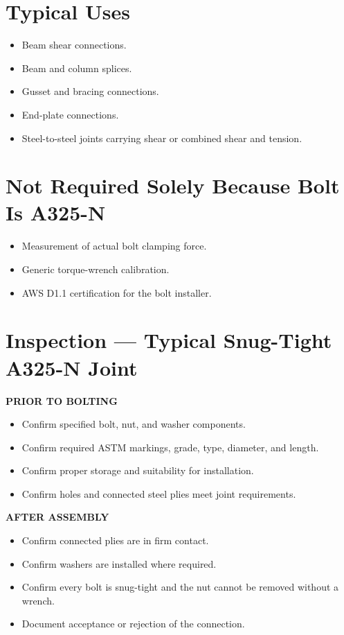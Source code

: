 \documentclass[10pt]{article}
\newcommand{\tightitem}[1]{\item #1}
\begin{document}
\vspace{2pt}
\noindent
\begin{minipage}[t]{0.48\textwidth}
\vspace{0pt}
\section{Typical Uses}

\footnotesize
\begin{itemize}
  \tightitem{Beam shear connections.}
  \tightitem{Beam and column splices.}
  \tightitem{Gusset and bracing connections.}
  \tightitem{End-plate connections.}
  \tightitem{Steel-to-steel joints carrying shear or combined shear and tension.}
\end{itemize}

\setcounter{section}{4}
\section{Not Required Solely Because Bolt Is A325-N}

\footnotesize
\begin{itemize}
  \tightitem{Measurement of actual bolt clamping force.}
  \tightitem{Generic torque-wrench calibration.}
  \tightitem{AWS D1.1 certification for the bolt installer.}
\end{itemize}
\end{minipage}\hfill
\begin{minipage}[t]{0.49\textwidth}
\vspace{0pt}
\setcounter{section}{3}
\section{Inspection --- Typical Snug-Tight A325-N Joint}

{\ttfamily\footnotesize\bfseries PRIOR TO BOLTING}

\footnotesize
\begin{itemize}
  \tightitem{Confirm specified bolt, nut, and washer components.}
  \tightitem{Confirm required ASTM markings, grade, type, diameter, and length.}
  \tightitem{Confirm proper storage and suitability for installation.}
  \tightitem{Confirm holes and connected steel plies meet joint requirements.}
\end{itemize}

{\ttfamily\footnotesize\bfseries AFTER ASSEMBLY}

\footnotesize
\begin{itemize}
  \tightitem{Confirm connected plies are in firm contact.}
  \tightitem{Confirm washers are installed where required.}
  \tightitem{Confirm every bolt is snug-tight and the nut cannot be removed without a wrench.}
  \tightitem{Document acceptance or rejection of the connection.}
\end{itemize}
\end{minipage}
\end{document}
